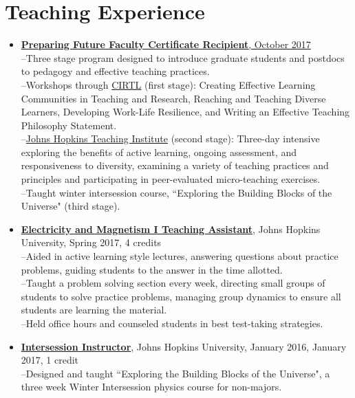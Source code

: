 \section*{ Teaching Experience}
 \begin{itemize}
 \item  {\href{http://cer.jhu.edu/teaching-academy/pff}{\textbf{Preparing Future Faculty Certificate Recipient}, October 2017}\\ 
--Three stage program designed to introduce graduate students and postdocs to pedagogy and effective teaching practices. \\
--Workshops through \href{https://www.cirtl.net/}{CIRTL} (first stage): Creating Effective Learning Communities in Teaching and Research, Reaching and Teaching Diverse Learners, Developing Work-Life Resilience, and Writing an Effective Teaching Philosophy Statement. \\
--\href{http://cer.jhu.edu/teaching-academy/ti}{Johns Hopkins Teaching Institute} (second stage): Three-day intensive exploring the benefits of active learning, ongoing assessment, and responsiveness to diversity, examining a variety of teaching practices and principles and participating in peer-evaluated micro-teaching exercises. \\
--Taught winter intersession course, ``Exploring the Building Blocks of the Universe" (third stage).}
 \item{\href{http://e-catalog.jhu.edu/departments-program-requirements-and-courses/arts-sciences/physics-astronomy/#undergraduateprogramstext}{\textbf{Electricity and Magnetism I Teaching Assistant}}, Johns Hopkins University, Spring 2017, 4 credits\\
--Aided in active learning style lectures, answering questions about practice problems, guiding students to the answer in the time allotted. \\
--Taught a problem solving section every week, directing small groups of students to solve practice problems, managing group dynamics to ensure all students are learning the material. \\
--Held office hours and counseled students in best test-taking strategies.}
 \item{\href{http://intersession.jhu.edu/icourses/courses/acad_courses.asp?de=32}{\textbf{Intersession Instructor}}, Johns Hopkins University, January 2016, January 2017, 1 credit\\
--Designed and taught ``Exploring the Building Blocks of the Universe", a three week Winter Intersession physics course for non-majors.\\
}
\end{itemize}
